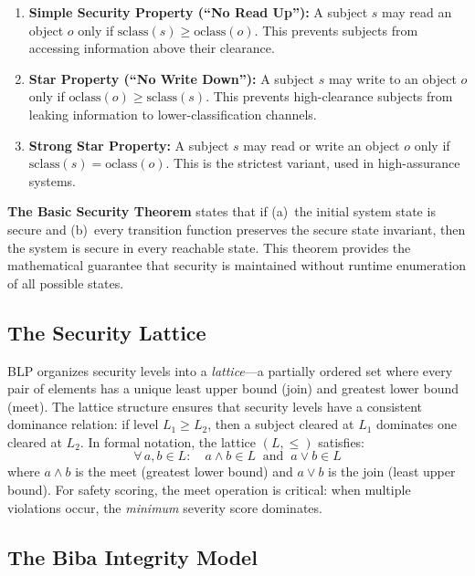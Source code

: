 \documentclass[manuscript,screen,review,anonymous]{acmart}
\begin{document}
\begin{enumerate}
    \item \textbf{Simple Security Property (``No Read Up''):} A subject $s$ may read an object $o$ only if $\text{sclass}(s) \geq \text{oclass}(o)$. This prevents subjects from accessing information above their clearance.
    \item \textbf{Star Property (``No Write Down''):} A subject $s$ may write to an object $o$ only if $\text{oclass}(o) \geq \text{sclass}(s)$. This prevents high-clearance subjects from leaking information to lower-classification channels.
    \item \textbf{Strong Star Property:} A subject $s$ may read or write an object $o$ only if $\text{sclass}(s) = \text{oclass}(o)$. This is the strictest variant, used in high-assurance systems.
\end{enumerate}

\textbf{The Basic Security Theorem} states that if (a)~the initial system state is secure and (b)~every transition function preserves the secure state invariant, then the system is secure in every reachable state. This theorem provides the mathematical guarantee that security is maintained without runtime enumeration of all possible states.

\subsection{The Security Lattice}

BLP organizes security levels into a \textit{lattice}---a partially ordered set where every pair of elements has a unique least upper bound (join) and greatest lower bound (meet). The lattice structure ensures that security levels have a consistent dominance relation: if level $L_1 \geq L_2$, then a subject cleared at $L_1$ dominates one cleared at $L_2$. In formal notation, the lattice $(L, \leq)$ satisfies:
\begin{equation}
\forall\, a, b \in L: \quad a \wedge b \in L \;\;\text{and}\;\; a \vee b \in L
\end{equation}
where $a \wedge b$ is the meet (greatest lower bound) and $a \vee b$ is the join (least upper bound). For safety scoring, the meet operation is critical: when multiple violations occur, the \textit{minimum} severity score dominates.

\subsection{The Biba Integrity Model}
\end{document}
